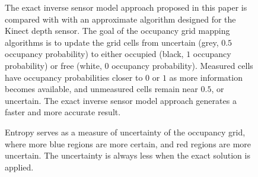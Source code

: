 \documentclass[letterpaper, 10pt, conference]{ieeeconf}
\begin{document}
\begin{figure}[h]
\label{fig:NumResOccProbs}
\centerline{
}
\centerline{
}
\centerline{
}
\centerline{
}
\centerline{
}
\caption{The exact inverse sensor model approach proposed in this paper is compared with with an approximate algorithm designed for the Kinect depth sensor. The goal of the occupancy grid mapping algorithms is to update the grid cells from uncertain (grey, $0.5$ occupancy probability) to either occupied (black, $1$ occupancy probability) or free (white, $0$ occupancy probability). Measured cells have occupancy probabilities closer to $0$ or $1$ as more information becomes available, and unmeasured cells remain near $0.5$, or uncertain. The exact inverse sensor model approach generates a faster and more accurate result.}
\end{figure}

\begin{figure}[h]
\label{fig:NumResOccH}
\centerline{
}
\centerline{
}
\caption{Entropy serves as a measure of uncertainty of the occupancy grid, where more blue regions are more certain, and red regions are more uncertain. The uncertainty is always less when the exact solution is applied.}
\end{figure}
\end{document}
